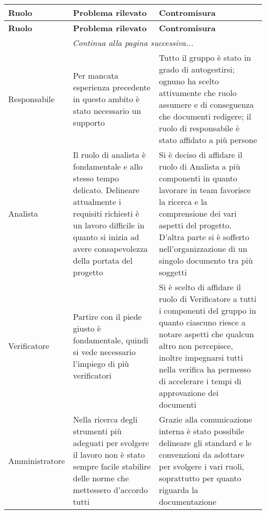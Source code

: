 \documentclass[../piano_di_qualifica.tex]{subfiles}
\begin{document}
\begin{center}
	\begin{longtable}{|p{2.5cm}|p{7cm}|p{7cm}|}
		\hline
		\rowcolor{lightgray}
		{\textbf{Ruolo}} & {\textbf{Problema rilevato}} & {\textbf{Contromisura}} \\
		\hline
		\endfirsthead
		\hline
		\rowcolor{lightgray}
		{\textbf{Ruolo}} & {\textbf{Problema rilevato}} & {\textbf{Contromisura}} \\
		\hline
		\endhead

		\hline
		\multicolumn{3}{|c|}{\emph{Continua alla pagina successiva...}} \\
		\hline
		\endfoot
		\endlastfoot

		Responsabile   & Per mancata esperienza precedente in questo ambito è stato necessario un supporto                                                                                                                          & Tutto il gruppo è stato in grado di autogestirsi; ognuno ha scelto attivamente che ruolo assumere e di conseguenza che documenti redigere; il ruolo di responsabile è stato affidato a più persone                                                                    \\
		Analista       & Il ruolo di analista è fondamentale e allo stesso tempo delicato. Delineare attualmente i requisiti richiesti è un lavoro difficile in quanto si inizia ad avere consapevolezza della portata del progetto & Si è deciso di affidare il ruolo di Analista a più componenti in quanto lavorare in team favorisce la ricerca e la comprensione dei vari aspetti del progetto. D'altra parte si è sofferto nell'organizzazione di un singolo documento tra più soggetti               \\
		Verificatore   & Partire con il piede giusto è fondamentale, quindi si vede necessario l'impiego di più verificatori                                                                                                        & Si è scelto di affidare il ruolo di Verificatore a tutti i componenti del gruppo in quanto ciascuno riesce a notare aspetti che qualcun altro non percepisce, inoltre impegnarsi tutti nella verifica ha permesso di accelerare i tempi di approvazione dei documenti \\
		Amministratore & Nella ricerca degli strumenti più adeguati per svolgere il lavoro non è stato sempre facile stabilire delle norme che mettessero d'accordo tutti                                                           & Grazie alla comunicazione interna è stato possibile delineare gli standard e le convenzioni da adottare per svolgere i vari ruoli, soprattutto per quanto riguarda la documentazione                                                                                  \\

\end{longtable}
\end{center}
\end{document}
